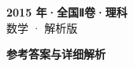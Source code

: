 \documentclass[zihao=-4, a4paper]{ctexart}
\begin{document}
\begin{center}
  {\Large\bfseries 2015 年·全国Ⅱ卷·理科}\\[4pt]
  {\large 数学 · 解析版}
\end{center}
\medskip
{}

\clearpage
{}
\begin{center}{\Large\bfseries 参考答案与详细解析}\end{center}
\medskip

\end{document}
